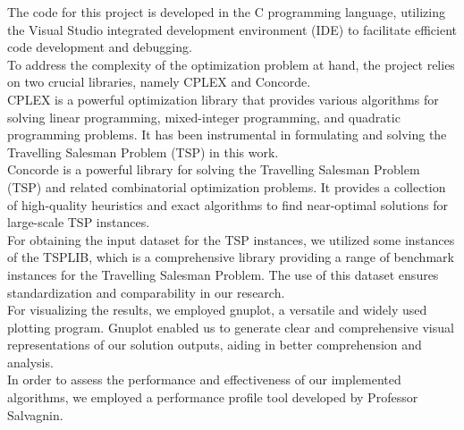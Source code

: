The code for this project is developed in the C programming language, utilizing the Visual Studio integrated development environment (IDE) to facilitate efficient code development and debugging.
\\To address the complexity of the optimization problem at hand, the project relies on two crucial libraries, namely CPLEX and Concorde. \\CPLEX is a powerful optimization library that provides various algorithms for solving linear programming, mixed-integer programming, and quadratic programming problems. It has been instrumental in formulating and solving the Travelling Salesman Problem (TSP) in this work.
\\
Concorde is a powerful library for solving the Travelling Salesman Problem (TSP) and related combinatorial optimization problems. It provides a collection of high-quality heuristics and exact algorithms to find near-optimal solutions for large-scale TSP instances. 
\\
For obtaining the input dataset for the TSP instances, we utilized some instances of the TSPLIB, which is a comprehensive library providing a range of benchmark instances for the Travelling Salesman Problem. The use of this dataset ensures standardization and comparability in our research.
\\
For visualizing the results, we employed gnuplot, a versatile and widely used plotting program. Gnuplot enabled us to generate clear and comprehensive visual representations of our solution outputs, aiding in better comprehension and analysis.
\\
In order to assess the performance and effectiveness of our implemented algorithms, we employed a performance profile tool developed by Professor Salvagnin.
